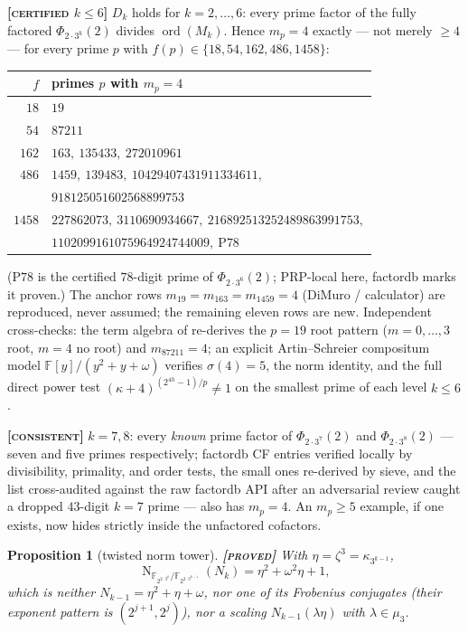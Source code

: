 \documentclass[11pt]{article}
\theoremstyle{plain}
\newtheorem{proposition}{Proposition}
\theoremstyle{definition}
\newcommand{\F}{\mathbb{F}}
\newcommand{\ord}{\operatorname{ord}}
\newcommand{\Norm}{\operatorname{N}}
\newcommand{\PROVED}{\textbf{[\textsc{proved}]}}
\newcommand{\CERTIFIED}[1]{\textbf{[\textsc{certified} $#1$]}}
\newcommand{\CONSISTENT}{\textbf{[\textsc{consistent}]}}
\begin{document}
\CERTIFIED{k\leq6} $D_k$ holds for $k=2,\dots,6$: every prime factor of
the fully factored $\Phi_{2\cdot3^k}(2)$ divides $\ord(M_k)$. Hence
$m_p=4$ exactly --- not merely $\geq4$ --- for every prime $p$ with
$f(p)\in\{18,54,162,486,1458\}$:
\begin{center}
\begin{tabular}{rl}
\toprule
$f$ & primes $p$ with $m_p=4$ \\
\midrule
$18$   & $19$ \\
$54$   & $87211$ \\
$162$  & $163,\ 135433,\ 272010961$ \\
$486$  & $1459,\ 139483,\ 10429407431911334611,$ \\
       & $918125051602568899753$ \\
$1458$ & $227862073,\ 3110690934667,\ 216892513252489863991753,$ \\
       & $1102099161075964924744009,\ \mathrm{P}78$ \\
\bottomrule
\end{tabular}
\end{center}
($\mathrm{P}78$ is the certified $78$-digit prime of
$\Phi_{2\cdot3^6}(2)$; PRP-local here, factordb marks it proven.) The
anchor rows $m_{19}=m_{163}=m_{1459}=4$ (DiMuro / calculator) are
reproduced, never assumed; the remaining eleven rows are new.
Independent cross-checks: the term algebra of
 re-derives the $p=19$ root
pattern ($m=0,\dots,3$ root, $m=4$ no root) and $m_{87211}=4$; an
explicit Artin--Schreier compositum model $\F[y]/(y^2+y+\omega)$
verifies $\sigma(4)=5$, the norm identity, and the full direct power
test $(\kappa+4)^{(2^{4h}-1)/p}\neq1$ on the smallest prime of each
level $k\leq6$.

\CONSISTENT{} $k=7,8$: every \emph{known} prime factor of
$\Phi_{2\cdot3^7}(2)$ and $\Phi_{2\cdot3^8}(2)$ --- seven and five
primes respectively; factordb CF entries verified locally by
divisibility, primality, and order tests, the small ones re-derived by
sieve, and the list cross-audited against the raw factordb API after an
adversarial review caught a dropped $43$-digit $k=7$ prime --- also has
$m_p=4$. An $m_p\geq5$ example, if one exists, now hides strictly
inside the unfactored cofactors.

\begin{proposition}[twisted norm tower]\label{prop:twisted}
\PROVED{} With $\eta=\zeta^3=\kappa_{3^{k-1}}$,
\[
  \Norm_{\F_{2^{2\cdot3^k}}/\F_{2^{2\cdot3^{k-1}}}}(N_k)
  =\eta^2+\omega^2\eta+1 ,
\]
which is neither $N_{k-1}=\eta^2+\eta+\omega$, nor one of its Frobenius
conjugates (their exponent pattern is $(2^{j+1},2^j)$), nor a scaling
$N_{k-1}(\lambda\eta)$ with $\lambda\in\mu_3$.
\end{proposition}
\end{document}
